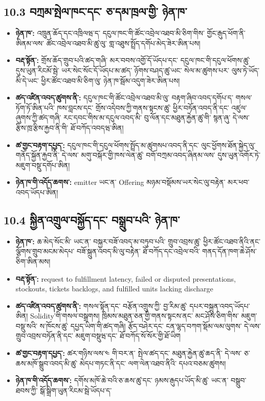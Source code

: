 \documentclass[11pt]{article}
\begin{document}
\subsection*{10.3 བཀྲམ་སྤེལ་ཁང་དང་ ཅ་དམ་ཁྲལ་གྱི་ ཉེན་ཁ་}

\begin{itemize}[leftmargin=*]
\item \textbf{ཉེན་ཁ་:} འཁྲུན་ཆོད་དང་འཁྲིལཝ་ད་ དངུལ་ཁང་གི་ཚོང་འབྲེལ་འཐབ་མི་ཅིག་གིས་ གྱོང་རྒུད་ཕོག་ནི་ཨིནམ་ལས་ ཚོང་འབྲེལ་འཐབ་མི་ཚུ་ལུ་ གླ་འཐུས་སྤྲོད་དགོཔ་མེད་ཟེར་ཨིན་པས།
\item \textbf{བརྡ་སྟོན་:} གྲོས་ཆོད་གྲུབ་པའི་ཚད་གཞི་ མར་བབས་འགྱོ་དོ་ཡོདཔ་དང་ དངུལ་ཁང་གི་དངུལ་ཕོགས་ཚུ་ དུས་ཡུན་རིངམོ་སྦེ་ ཡར་སེང་སོང་དོ་ཡོདཔ་མ་ཚད་ ཉོགས་བཤད་ཚུ་ཡང་ སེལ་མ་ཚུགས་པར་ ལུས་ཏེ་ཡོད་མི་དེ་ཡང་ ཕྱིར་ཚོང་འཐབ་མི་ཅིག་ལུ་ ཉེན་ཁ་སྦོམ་འདུག་ཟེར་ཨིན་པས།
\item \textbf{ཚད་འཛིན་འབད་ཚུགས་ནི་:} དངུལ་ཁང་གི་ཚོང་འབྲེལ་འཐབ་མི་ལུ་ བརྟག་ཞིབ་འབད་དགོཔ་ད་ གསལ་ཏོག་ཏོ་ཨིན་པའི་ ཁས་བླངས་དང་ གྲོས་འདེབས་ཀྱི་གནས་སྟངས་ཚུ་ ཕྱིར་བཏོན་འབད་ནི་དང་ འཛུལ་ཞུགས་ཀྱི་ཚད་གཞི་ རང་དབང་གིས་མ་དངུལ་འབད་མི་ བུ་ལོན་དང་མཐུན་རྐྱེན་ཚུ་གི་ སྙན་ཞུ་ དེ་ལས་ རྩིས་ཁྲ་རྩིས་རྐྱབ་ནི་གི་ ཐོ་བཀོད་འབདཝ་ཨིན།
\item \textbf{ཚ་གྱང་བརྟག་དཔྱད་:} དངུལ་ཁང་གི་དངུལ་ཕོགས་སྤྲོད་མ་ཚུགསཔ་འབད་ནི་དང་ ལུང་ཕྱོགས་ཐོན་སྐྱེད་ལུ་ གནོད་སྐྱོན་རྐྱབ་ནི་ དེ་ལས་ མགུ་བསྐོར་གྱི་ཁས་ལེན་ཚུ་ བགོ་བཀྲམ་འབད་ཞིནམ་ལས་ དུས་ཡུན་འགོར་ཏེ་ མཇུག་བསྡུ་དགོཔ་ཨིན།
\item \textbf{ཉེན་ཁ་གི་འདོད་ཆགས་:} emitter ཡང་ན་ Offering མཉམ་བསྡོམས་ཡར་སེང་ལུ་བརྟེན་ མར་ཕབ་འབད་ཡོདཔ་ཨིན།
\end{itemize}
\subsection*{10.4 སྐྱིན་འགྲུལ་བསྐྱོད་དང་ བསྒྲུབ་པའི་ ཉེན་ཁ་}

\begin{itemize}[leftmargin=*]
\item \textbf{ཉེན་ཁ་:} ཆ་མེད་སོང་མི་ ཡང་ན་ བསྐྱར་བཟོ་འབད་མ་བཏུབ་པའི་ གྲུབ་འབྲས་ཚུ་ ཕྱིར་ཚོང་འཐབ་ནིའི་ནང་ ལྕོགས་གྲུབ་མངམ་མེདཔ་ བཟོ་སྐྲུན་འབད་མི་ལུ་བརྟེན་ ཐོ་བཀོད་དང་འབྲེལ་བའི་ གནད་དོན་ཁག་ཆེ་ཤོས་ཅིག་ཨིན་མས།
\item \textbf{བརྡ་སྟོན་:} request to fulfillment latency, failed or disputed presentations, stockouts, tickets backlogs, and fulfilled units lacking discharge
\item \textbf{ཚད་འཛིན་འབད་ཚུགས་ནི་:} གསལ་སྟོན་དང་ བརྩོན་འགྲུས་ཀྱི་ བྱ་རིམ་ཚུ་ དཔར་བསྐྲུན་འབད་ཡོདཔ་ཨིན། Solidity་གི་གསལ་བསྒྲགས། ཁྲིམས་མཐུན་ཅན་གྱི་གནས་སྟངས་ནང་ མང་ཤོས་ཅིག་གིས་ མཇུག་བསྡུ་སའི་ ས་ཁོངས་ཚུ་ དཔྱད་ཡིག་གི་ཚད་གཞི། རྩོད་བཤེར་དང་ ངན་ལྷད་བཀག་སྡོམ་ལམ་ལུགས་ དེ་ལས་ གྲུབ་འབྲས་བཏོན་ནི་དང་ མཇུག་བསྡུཝ་དང་ ཐོ་བཀོད་སོ་སོར་གྱི་ཐོ་ཡིག
\item \textbf{ཚ་གྱང་བརྟག་དཔྱད་:} ཚར་གཉིས་ལས་༤ གི་བར་ན་ སྤེལ་ཚད་དང་ མཐུན་རྐྱེན་ཚུ་ཆད་ནི་ དེ་ལས་ ཅ་ཆས་མཁོ་སྒྲུབ་འབད་མི་ཚུ་ མེདཔ་གཏང་ནི་དང་ ལག་ལེན་འཐབ་ནིའི་ དཔའ་བཅམ་ཚུགས།
\item \textbf{ཉེན་ཁ་གི་འདོད་ཆགས་:} དགོས་མཁོ་ཆེ་བའི་ཅ་ཆས་ཚུ་དང་ ཉམས་རྒུདཔ་ཡོད་མི་ཚུ་ ཡང་ན་ བསྒྲུབ་ཐབས་ཀྱི་ སྒོ་སྒྲིག་ཡུན་རིངམ་སྦེ་ཡོདཔ་ད་
\end{itemize}
\end{document}
